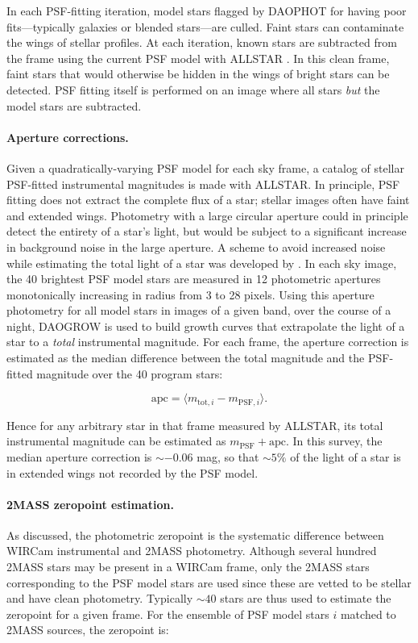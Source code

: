 \documentclass[iop]{emulateapj}
\begin{document}
In each PSF-fitting iteration, model stars flagged by DAOPHOT for having poor fits---typically galaxies or blended stars---are culled. Faint stars can contaminate the wings of stellar profiles. At each iteration, known stars are subtracted from the frame using the current PSF model with ALLSTAR \citep{Stetson:1994}. In this clean frame, faint stars that would otherwise be hidden in the wings of bright stars can be detected. PSF fitting itself is performed on an image where all stars \emph{but} the model stars are subtracted.

\paragraph{Aperture corrections.} Given a quadratically-varying PSF model for each sky frame, a catalog of stellar PSF-fitted instrumental magnitudes is made with ALLSTAR. In principle, PSF fitting does not extract the complete flux of a star; stellar images often have faint and extended wings. Photometry with a large circular aperture could in principle detect the entirety of a star's light, but would be subject to a significant increase in background noise in the large aperture. A scheme to avoid increased noise while estimating the total light of a star was developed by \cite{Stetson:1990}. In each sky image, the 40 brightest PSF model stars are measured in 12 photometric apertures monotonically increasing in radius from 3 to 28 pixels. Using this aperture photometry for all model stars in images of a given band, over the course of a night, DAOGROW is used to build growth curves that extrapolate the light of a star to a \emph{total} instrumental magnitude. For each frame, the aperture correction is estimated as the median difference between the total magnitude and the PSF-fitted magnitude over the 40 program stars:

\begin{equation}
    \text{apc} = \langle m_{\text{tot},i} - m_{\text{PSF},i}\rangle .
\end{equation}

\noindent Hence for any arbitrary star in that frame measured by ALLSTAR, its total instrumental magnitude can be estimated as $m_\text{PSF} + \text{apc}$. In this survey, the median aperture correction is $\sim-0.06$ mag, so that $\sim5\%$ of the light of a star is in extended wings not recorded by the PSF model.

\paragraph{2MASS zeropoint estimation.} As discussed, the photometric zeropoint is the systematic difference between WIRCam instrumental and 2MASS photometry. Although several hundred 2MASS stars may be present in a WIRCam frame, only the 2MASS stars corresponding to the PSF model stars are used since these are vetted to be stellar and have clean photometry. Typically $\sim 40$ stars are thus used to estimate the zeropoint for a given frame. For the ensemble of PSF model stars $i$ matched to 2MASS sources, the zeropoint is:
\end{document}
